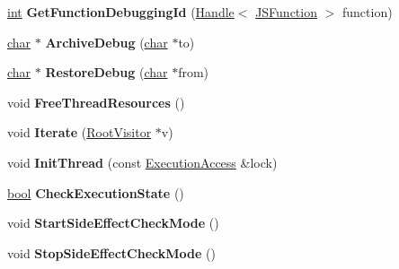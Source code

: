\begin{DoxyCompactItemize}
\mbox{\hyperlink{classint}{int}} {\bfseries Get\+Function\+Debugging\+Id} (\mbox{\hyperlink{classv8_1_1internal_1_1Handle}{Handle}}$<$ \mbox{\hyperlink{classv8_1_1internal_1_1JSFunction}{J\+S\+Function}} $>$ function)
\item 
\mbox{\label{classv8_1_1internal_1_1Debug_a728b6f78ff43400533ea5c0c5ac00f19}} 
\mbox{\hyperlink{classchar}{char}} $\ast$ {\bfseries Archive\+Debug} (\mbox{\hyperlink{classchar}{char}} $\ast$to)
\item 
\mbox{\label{classv8_1_1internal_1_1Debug_adecb3c22088fc338ea44d910ae2158aa}} 
\mbox{\hyperlink{classchar}{char}} $\ast$ {\bfseries Restore\+Debug} (\mbox{\hyperlink{classchar}{char}} $\ast$from)
\item 
\mbox{\label{classv8_1_1internal_1_1Debug_a85b2eb55cc26c9140c90a82c73f45da8}} 
void {\bfseries Free\+Thread\+Resources} ()
\item 
\mbox{\label{classv8_1_1internal_1_1Debug_aa41a92d1e455e650d34d620620e9b00a}} 
void {\bfseries Iterate} (\mbox{\hyperlink{classv8_1_1internal_1_1RootVisitor}{Root\+Visitor}} $\ast$v)
\item 
\mbox{\label{classv8_1_1internal_1_1Debug_a5e3356bd0c476f0f9924578e7033c74d}} 
void {\bfseries Init\+Thread} (const \mbox{\hyperlink{classv8_1_1internal_1_1ExecutionAccess}{Execution\+Access}} \&lock)
\item 
\mbox{\label{classv8_1_1internal_1_1Debug_a142145f8b6f70d1f54dd5ead8ee25f28}} 
\mbox{\hyperlink{classbool}{bool}} {\bfseries Check\+Execution\+State} ()
\item 
\mbox{\label{classv8_1_1internal_1_1Debug_a5706a861e215d00bc5cf5bd84c2ff301}} 
void {\bfseries Start\+Side\+Effect\+Check\+Mode} ()
\item 
\mbox{\label{classv8_1_1internal_1_1Debug_a42ac0f53cd5c5f130a4f47247fad8252}} 
void {\bfseries Stop\+Side\+Effect\+Check\+Mode} ()
\item 
\mbox{\label{classv8_1_1internal_1_1Debug_aaf3e6b3e4ec76b341b209f7fe6327de5}} 

\end{DoxyCompactItemize}

